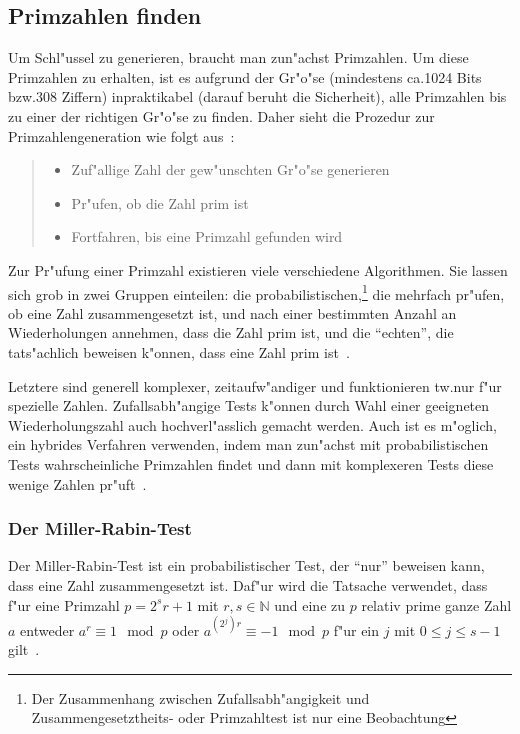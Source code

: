 \documentclass[12pt]{article}
\begin{document}
\subsection{Primzahlen finden}
\label{subsec:practical:primes}
Um Schl"ussel zu generieren, braucht man zun"achst Primzahlen.
Um diese Primzahlen zu erhalten, ist es aufgrund der Gr"o"se
(mindestens ca.\@ 1024 Bits bzw.\@ 308 Ziffern)
inpraktikabel (darauf beruht die Sicherheit),
alle Primzahlen bis zu einer der richtigen Gr"o"se zu finden.
Daher sieht die Prozedur zur Primzahlengeneration wie folgt aus~\cite{hac}:
\begin{quote}
\begin{itemize}
    \item Zuf"allige Zahl der gew"unschten Gr"o"se generieren
    \item Pr"ufen, ob die Zahl prim ist
    \item Fortfahren, bis eine Primzahl gefunden wird
\end{itemize}
\end{quote}

Zur Pr"ufung einer Primzahl existieren viele verschiedene Algorithmen.
Sie lassen sich grob in zwei Gruppen einteilen:
die probabilistischen,\footnote{Der Zusammenhang zwischen Zufallsabh"angigkeit und Zusammengesetztheits-
oder Primzahltest ist nur eine Beobachtung} die mehrfach pr"ufen, ob eine Zahl zusammengesetzt ist,
und nach einer bestimmten Anzahl an Wiederholungen annehmen, dass die Zahl prim ist,
und die "`echten"', die tats"achlich beweisen k"onnen, dass eine Zahl prim ist~\cite{hac}.

Letztere sind generell komplexer, zeitaufw"andiger und funktionieren tw.\@ nur
f"ur spezielle Zahlen.
Zufallsabh"angige Tests k"onnen durch Wahl einer geeigneten Wiederholungszahl
auch hochverl"asslich gemacht werden.
Auch ist es m"oglich, ein hybrides Verfahren verwenden,
indem man zun"achst mit probabilistischen Tests
wahrscheinliche Primzahlen findet und dann mit komplexeren Tests
diese wenige Zahlen pr"uft~\cite{hac}.

\subsubsection{Der Miller-Rabin-Test}
Der Miller-Rabin-Test ist ein probabilistischer Test, der "`nur"' beweisen kann,
dass eine Zahl zusammengesetzt ist.
Daf"ur wird die Tatsache verwendet, dass f"ur eine Primzahl $p = 2^s r+1$ mit $r, s \in \mathbb{N}$
und eine zu $p$ relativ prime ganze Zahl $a$ entweder $a^r \equiv 1 \mod p$ oder
$a^{(2^j)r} \equiv -1 \mod p$ f"ur ein $j$ mit $0 \leq j \leq s-1$ gilt~\cite{hac}.
\end{document}
